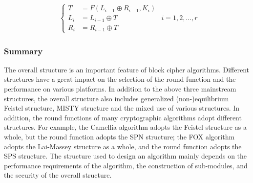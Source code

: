 \begin{equation}
    \begin{aligned}
        \begin{cases}
            T&=F(L_{i-1}\oplus R_{i-1},K_i)\\
            L_i&=L_{i-1}\oplus T\\
            R_i&=R_{i-1}\oplus T
        \end{cases}
    \end{aligned}
    i=1,2,\dots,r  
    \label{eq3}
\end{equation}

\subsubsection{Summary}
The overall structure is an important feature of block cipher algorithms. Different structures have a great impact on the selection of the round function and the performance on various platforms. In addition to the above three mainstream structures, the overall structure also includes generalized (non-)equilibrium Feistel structure, MISTY structure and the mixed use of various structures. In addition, the round functions of many cryptographic algorithms adopt different structures. For example, the Camellia algorithm adopts the Feistel structure as a whole, but the round function adopts the SPN structure; the FOX algorithm adopts the Lai-Massey structure as a whole, and the round function adopts the SPS structure. The structure used to design an algorithm mainly depends on the performance requirements of the algorithm, the construction of sub-modules, and the security of the overall structure.


